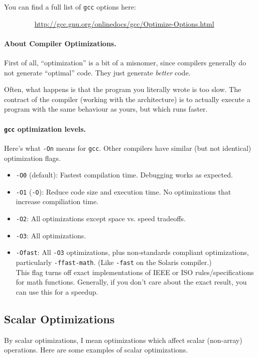 \documentclass[a4paper]{report}
\begin{document}
You can find a full list of {\tt gcc} options here:

$\qquad \qquad$ \url{http://gcc.gnu.org/onlinedocs/gcc/Optimize-Options.html}

\paragraph{About Compiler Optimizations.} First of all, ``optimization'' is
a bit of a misnomer, since compilers generally do not generate ``optimal'' code.
They just generate \emph{better} code.

Often, what happens is that the program you literally wrote is too slow. The
contract of the compiler (working with the architecture) is to actually execute
a program with the same behaviour as yours, but which runs faster.

\paragraph{{\tt gcc} optimization levels.} Here's what {\tt -On} means for
{\tt gcc}. Other compilers have similar (but not identical) optimization flags.

\begin{itemize}[noitemsep]
\item {\tt -O0} (default): Fastest compilation time. Debugging works as expected.
\item {\tt -O1} ({\tt -O}): Reduce code size and execution time.
 No optimizations that increase compiliation time.
\item {\tt -O2}: All optimizations except space vs. speed tradeoffs.
\item {\tt -O3}: All optimizations.
\item {\tt -Ofast}: All {\tt -O3} optimizations, plus non-standards compliant optimizations,
      particularly {\tt -ffast-math}. (Like {\tt -fast} on the Solaris compiler.)\\[1em]
  This flag turns off exact implementations of IEEE or ISO rules/specifications for math
  functions. Generally, if you don't care about the exact result, you can use this for
  a speedup.
\end{itemize}

\subsection*{Scalar Optimizations}
By scalar optimizations, I mean optimizations
which affect scalar (non-array) operations. Here are some examples of scalar
optimizations.
\end{document}
